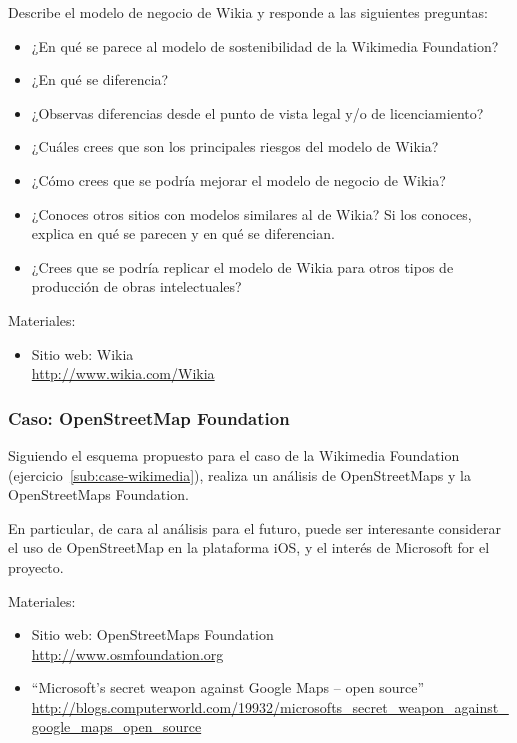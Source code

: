 \documentclass[a4paper,12pt]{article}
\begin{document}
Describe el modelo de negocio de Wikia y responde a las siguientes preguntas:

\begin{itemize}
\item ¿En qué se parece al modelo de sostenibilidad de la Wikimedia Foundation?
\item ¿En qué se diferencia?
\item ¿Observas diferencias desde el punto de vista legal y/o de licenciamiento?
\item ¿Cuáles crees que son los principales riesgos del modelo de Wikia?
\item ¿Cómo crees que se podría mejorar el modelo de negocio de Wikia?
\item ¿Conoces otros sitios con modelos similares al de Wikia? Si los conoces, explica en qué se parecen y en qué se diferencian.
\item ¿Crees que se podría replicar el modelo de Wikia para otros tipos de producción de obras intelectuales? 
\end{itemize}

Materiales:

\begin{itemize}
\item Sitio web: Wikia \\
  \url{http://www.wikia.com/Wikia}
\end{itemize}

\subsubsection{Caso: OpenStreetMap Foundation}
\label{sub:case-openstreetmap}

Siguiendo el esquema propuesto para el caso de la Wikimedia Foundation (ejercicio~\ref{sub:case-wikimedia}), realiza un análisis de OpenStreetMaps y la OpenStreetMaps Foundation.

En particular, de cara al análisis para el futuro, puede ser interesante considerar el uso de OpenStreetMap en la plataforma iOS, y el interés de Microsoft for el proyecto.

Materiales:

\begin{itemize}
\item Sitio web: OpenStreetMaps Foundation \\
  \url{http://www.osmfoundation.org}
\item ``Microsoft's secret weapon against Google Maps -- open source'' \\
  \url{http://blogs.computerworld.com/19932/microsofts_secret_weapon_against_google_maps_open_source}
\end{itemize}
\end{document}
